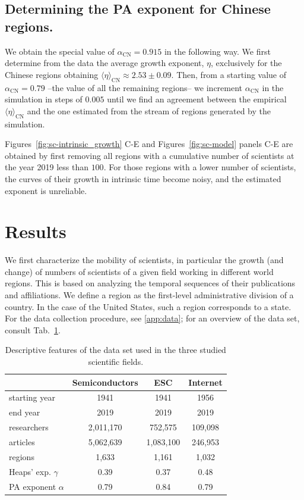 \documentclass[draft,final]{vutinfth} %
\begin{document}
\subsection{Determining the PA exponent for Chinese regions.}
We obtain the special value of  $\alpha_\mathrm{CN}=0.915$ in the following way.
We first determine from the data the average growth exponent, $\eta$, exclusively for the Chinese regions obtaining $\langle \eta \rangle_\mathrm{CN}\approx 2.53\pm 0.09$.
Then, from a starting value of $\alpha_\mathrm{CN}=0.79$ --the value of all the remaining regions--  we increment $\alpha_\mathrm{CN}$ in the simulation in steps of $0.005$ until we find an agreement between the empirical $\langle \eta \rangle_\mathrm{CN}$ and the one estimated from the stream of regions  generated by the simulation.

Figures~\ref{fig:sc-intrinsic_growth} C-E and Figures~\ref{fig:sc-model} panels C-E are obtained by first removing all regions with a cumulative number of scientists at the year 2019 less than $100$.
For those regions with a lower number of scientists, the curves of their growth in intrinsic time become noisy, and the estimated exponent  is unreliable.

\section{Results}
\label{sec:results}
We first characterize the mobility of scientists, in particular the growth (and change) of numbers of scientists of a given field working in different world regions. This is based on analyzing the temporal sequences of their publications and affiliations. We define a region as the first-level  administrative division of a country. In the case of the United States, such a region corresponds to a state. For the data collection procedure, see \ref{app:data}; for an overview of the data set, consult Tab.~\ref{tab:fields}. 
\begin{table}[tb]
    \centering
    \caption{Descriptive features of the data set used in the three studied scientific fields. 
}
    \begin{tabular}{l c c c }
                &  Semiconductors  & ESC & Internet \\
    \hline
starting year   & 1941      & 1941      & 1956      \\
end year        & 2019      & 2019      & 2019\\
researchers     & 2,011,170 & 752,575   & 109,098   \\
articles        & 5,062,639 & 1,083,100 & 246,953   \\
regions          & 1,633    & 1,161     & 1,032     \\
Heaps' exp. $\gamma$    & 0.39     & 0.37  & 0.48  \\
PA exponent  $\alpha$    & 0.79     & 0.84  & 0.79  \\
\end{tabular}
    \label{tab:fields}
\end{table}
\end{document}
